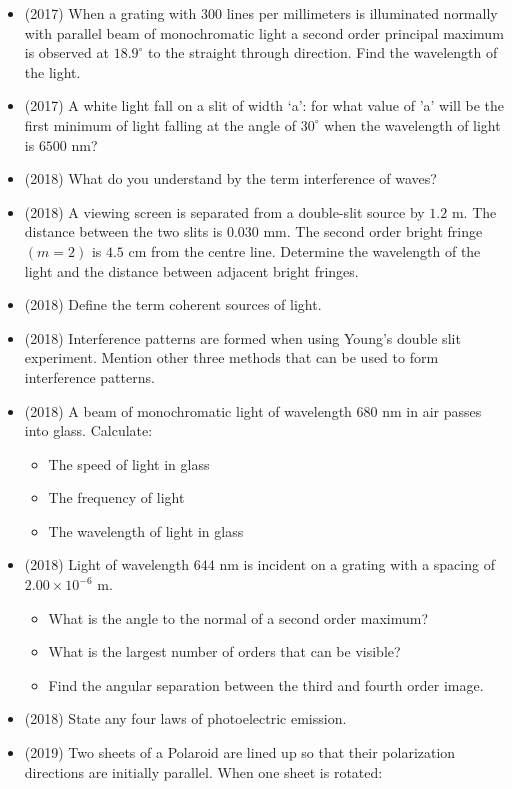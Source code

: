 \documentclass{article}
\begin{document}
\begin{itemize}
\item (2017)  When a grating with $ 300$ lines per millimeters is illuminated normally with parallel beam of monochromatic light a second order principal maximum is observed at $ 18.9^{\circ}$ to the straight through direction. Find the wavelength of the light.
\item (2017)  A white light fall on a slit of width ‘a’: for what value of 'a' will be the first minimum of light falling at the angle of $ 30^{\circ}$ when the wavelength of light is $ 6500$ nm? 
\item (2018)  What do you understand by the term interference of waves?
\item (2018)  A viewing screen is separated from a double-slit source by $ 1.2$ m. The distance between the two slits is $ 0.030$ mm. The second order bright fringe $ (m=2)$ is $ 4.5$ cm from the centre line. Determine the wavelength of the light and the distance between adjacent bright fringes. 
\item (2018)  Define the term coherent sources of light. 
\item (2018)  Interference patterns are formed when using Young’s double slit experiment. Mention other three methods that can be used to form interference patterns. 
\item (2018)  A beam of monochromatic light of wavelength $ 680$ nm in air passes into glass.  Calculate: 
 \begin{itemize}
\item The speed of light in glass
\item The frequency of light
\item The wavelength of light in glass
\end{itemize}
\item (2018)  Light of wavelength $ 644$ nm is incident on a grating with a spacing of $ 2.00 \times 10^{-6}$ m. 
 \begin{itemize}
\item What is the angle to the normal of a second order maximum? 
\item What is the largest number of orders that can be visible? 
\item Find the angular separation between the third and fourth order image.
\end{itemize}
\item (2018)  State any four laws of photoelectric emission. 
\item (2019)  Two sheets of a Polaroid are lined up so that their polarization directions are initially parallel. When one sheet is rotated:

\end{itemize}
\end{document}
